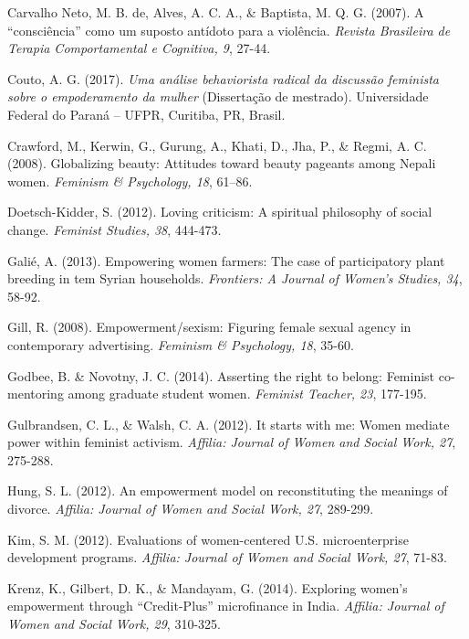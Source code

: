 \hangindent=25pt
\noindent Carvalho Neto, M. B. de, Alves, A. C. A., \& Baptista, M. Q. G. (2007). A ``consciência'' como um suposto antídoto para a violência. \textit{Revista Brasileira de Terapia Comportamental e Cognitiva, 9}, 27-44.

\hangindent=25pt
\noindent Couto, A. G. (2017). \textit{Uma análise behaviorista radical da discussão feminista sobre o empoderamento da mulher} (Dissertação de mestrado). Universidade Federal do Paraná – UFPR, Curitiba, PR, Brasil.

\hangindent=25pt
\noindent Crawford, M., Kerwin, G., Gurung, A., Khati, D., Jha, P., \& Regmi, A. C. (2008). Globalizing beauty: Attitudes toward beauty pageants among Nepali women. \textit{Feminism \& Psychology, 18}, 61–86.

\hangindent=25pt
\noindent Doetsch-Kidder, S. (2012). Loving criticism: A spiritual philosophy of social change. \textit{Feminist Studies, 38}, 444-473.

\hangindent=25pt
\noindent Galié, A. (2013). Empowering women farmers: The case of participatory plant breeding in tem Syrian households. \textit{Frontiers: A Journal of Women’s Studies, 34}, 58-92.

\hangindent=25pt
\noindent Gill, R. (2008). Empowerment/sexism: Figuring female sexual agency in contemporary advertising. \textit{Feminism \& Psychology, 18}, 35-60.

\hangindent=25pt
\noindent Godbee, B. \& Novotny, J. C. (2014). Asserting the right to belong: Feminist co-mentoring among graduate student women. \textit{Feminist Teacher, 23}, 177-195.

\hangindent=25pt
\noindent Gulbrandsen, C. L., \& Walsh, C. A. (2012). It starts with me: Women mediate power within feminist activism. \textit{Affilia: Journal of Women and Social Work, 27}, 275-288.

\hangindent=25pt
\noindent Hung, S. L. (2012). An empowerment model on reconstituting the meanings of divorce. \textit{Affilia: Journal of Women and Social Work, 27}, 289-299.

\hangindent=25pt
\noindent Kim, S. M. (2012). Evaluations of women-centered U.S. microenterprise development programs. \textit{Affilia: Journal of Women and Social Work, 27}, 71-83.

\hangindent=25pt
\noindent Krenz, K., Gilbert, D. K., \& Mandayam, G. (2014). Exploring women’s empowerment through ``Credit-Plus'' microfinance in India. \textit{Affilia: Journal of Women and Social Work, 29}, 310-325.

